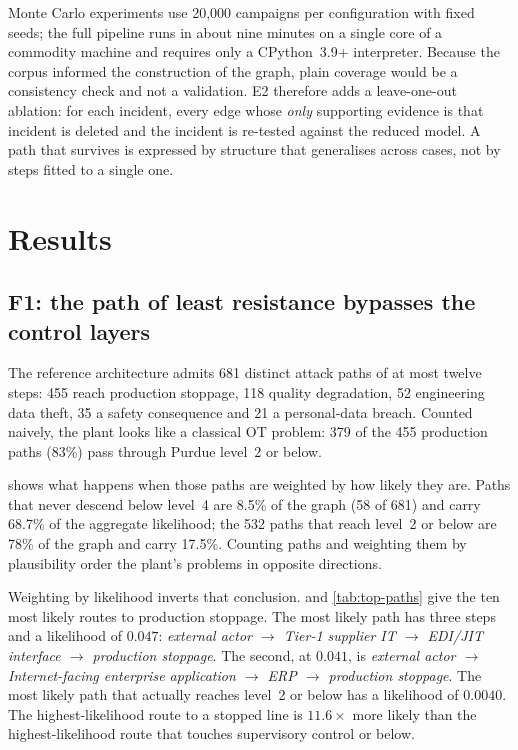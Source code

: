 Monte Carlo experiments use 20,000 campaigns per configuration with fixed
seeds; the full pipeline runs in about nine minutes on a single core of a
commodity machine and requires only a CPython~3.9+ interpreter. Because the
corpus informed the construction of the graph, plain coverage would be a consistency check and not a validation. E2 therefore adds a leave-one-out
ablation: for each incident, every edge whose \emph{only} supporting evidence
is that incident is deleted and the incident is re-tested against the reduced
model. A path that survives is expressed by structure that generalises across cases, not by steps fitted to a single one.

\section{Results}
\label{sec:results}

\subsection{F1: the path of least resistance bypasses the control layers}

The reference architecture admits 681 distinct attack paths of at most twelve
steps: 455 reach production stoppage, 118 quality degradation, 52 engineering
data theft, 35 a safety consequence and 21 a personal-data breach. Counted
naively, the plant looks like a classical OT problem: 379 of the 455 production
paths (83\%) pass through Purdue level~2 or below.

 shows what happens when those paths are weighted by how likely
they are. Paths that never descend below level~4 are 8.5\% of the graph (58 of 681)
and carry 68.7\% of the aggregate likelihood; the 532 paths that
reach level~2 or below are 78\% of the graph and carry 17.5\%. Counting paths and
weighting them by plausibility order the plant's problems in opposite
directions.



Weighting by likelihood inverts that conclusion.  and
\cref{tab:top-paths} give the ten most likely routes to production stoppage.
The most likely path has three steps and a likelihood of $0.047$:
\emph{external actor $\to$ Tier-1 supplier IT $\to$ EDI/JIT interface $\to$
production stoppage}. The second, at $0.041$, is \emph{external actor $\to$
Internet-facing enterprise application $\to$ ERP $\to$ production stoppage}.
The most likely path that actually reaches level~2 or below has a likelihood of
$0.0040$. The highest-likelihood route to a stopped line is $11.6\times$ more
likely than the highest-likelihood route that touches supervisory control
or below.

